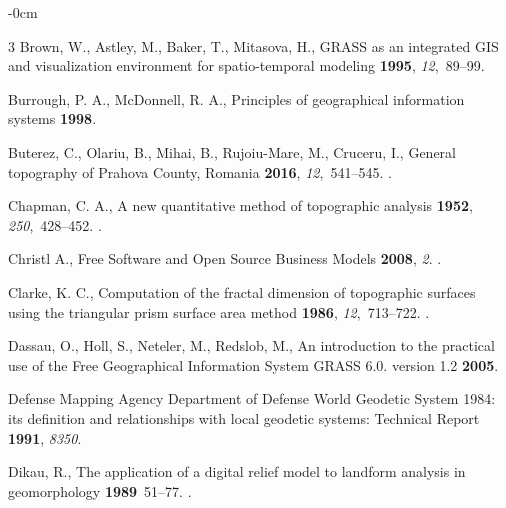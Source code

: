 \documentclass[technologies,article,submit,pdftex,moreauthors]{Definitions/mdpi}
\begin{document}
\begin{adjustwidth}{-\extralength}{0cm}
\begin{thebibliography}{3}
Brown, W., Astley, M., Baker, T., Mitasova, H., 
\newblock GRASS as an integrated GIS and visualization environment for spatio-temporal modeling
 {\bf 1995}, {\em 12},~89--99. 

Burrough, P. A., McDonnell, R. A.,
\newblock Principles of geographical information systems
 {\bf 1998}. 
 
Buterez,  C., Olariu, B., Mihai, B., Rujoiu-Mare, M., Cruceru, I., 
\newblock General topography of Prahova County, Romania
 {\bf 2016}, {\em 12},~541--545. 
.
  
 Chapman, C. A., 
\newblock A new quantitative method of topographic analysis
 {\bf 1952}, {\em 250},~428--452. 
.

Christl A.,  
\newblock Free Software and Open Source Business Models
 {\bf 2008}, {\em 2}. 
.

Clarke, K. C., 
\newblock Computation of the fractal dimension of topographic surfaces using the triangular prism surface area method
 {\bf 1986}, {\em 12},~713--722. 
.

Dassau, O., Holl, S., Neteler, M., Redslob, M.,
\newblock An introduction to the practical use of the Free Geographical Information System GRASS 6.0. version 1.2
 {\bf 2005}.

Defense Mapping Agency
\newblock Department of Defense World Geodetic System 1984: its definition and relationships with local geodetic systems: Technical Report
 {\bf 1991}, {\em 8350}.

Dikau, R., 
\newblock The application of a digital relief model to landform analysis in geomorphology
 {\bf 1989}~51--77. 
.


\end{thebibliography}
\end{adjustwidth}
\end{document}
